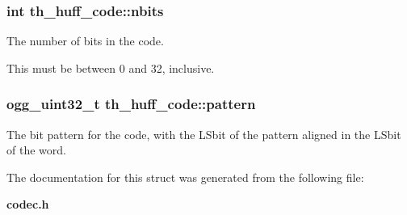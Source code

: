 \subsubsection[{nbits}]{\setlength{\rightskip}{0pt plus 5cm}int th\-\_\-huff\-\_\-code\-::nbits}\label{structth__huff__code_aaf97b8f2f90042f7bc136a7b2bc35e35}


The number of bits in the code. 

This must be between 0 and 32, inclusive. 
\subsubsection[{pattern}]{\setlength{\rightskip}{0pt plus 5cm}ogg\-\_\-uint32\-\_\-t th\-\_\-huff\-\_\-code\-::pattern}\label{structth__huff__code_a6dd29e3aa5a0c5a2dd5ce1f45b1162b4}


The bit pattern for the code, with the L\-Sbit of the pattern aligned in the L\-Sbit of the word. 



The documentation for this struct was generated from the following file\-:\begin{DoxyCompactItemize}
\item 
{\bf codec.\-h}\end{DoxyCompactItemize}
